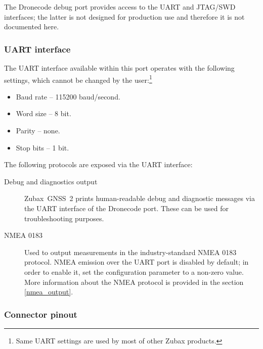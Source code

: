 \documentclass{zubaxdoc}
\begin{document}
The Dronecode debug port provides access to the UART and JTAG/SWD interfaces;
the latter is not designed for production use and therefore it is not documented here.

\subsubsection{UART interface}

The UART interface available within this port operates with the following settings,
which cannot be changed by the user:\footnote{
Same UART settings are used by most of other Zubax products.}
\begin{itemize}
    \item Baud rate -- 115200 baud/second.
    \item Word size -- 8 bit.
    \item Parity -- none.
    \item Stop bits -- 1 bit.
\end{itemize}

The following protocols are exposed via the UART interface:
\begin{description}

    \item[Debug and diagnostics output] Zubax~GNSS~2 prints human-readable debug and diagnostic messages
    via the UART interface of the Dronecode port.
    These can be used for troubleshooting purposes.

    \item[NMEA 0183] Used to output measurements in the industry-standard NMEA 0183 protocol.
    NMEA emission over the UART port is disabled by default;
    in order to enable it, set the configuration parameter  to a non-zero value.
    More information about the NMEA protocol is provided in the section \ref{nmea_output}.

\end{description}

\subsubsection{Connector pinout}
\end{document}
